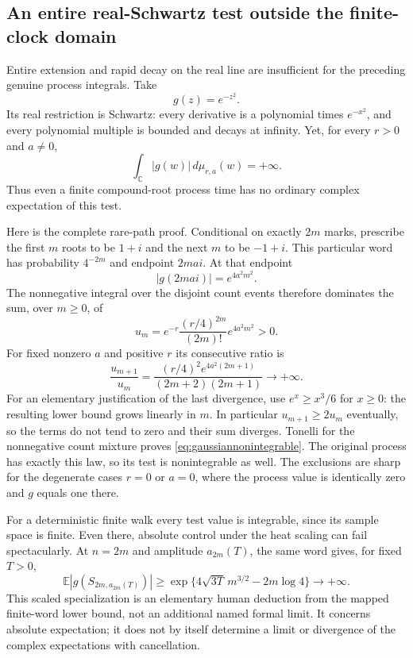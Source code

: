 \documentclass[11pt]{article}
\newcommand{\C}{\mathbb C}\newcommand{\R}{\mathbb R}
\newcommand{\E}{\mathbb E}\newcommand{\Pp}{\mathbb P}
\begin{document}
\subsection*{An entire real-Schwartz test outside the finite-clock domain}
Entire extension and rapid decay on the real line are insufficient for
the preceding genuine process integrals. Take
\[
 g(z)=e^{-z^2}.
\]
Its real restriction is Schwartz: every derivative is a polynomial
times $e^{-x^2}$, and every polynomial multiple is bounded and decays
at infinity. Yet, for every $r>0$ and $a\ne0$,
\begin{equation}\label{eq:gaussiannonintegrable}
 \int_{\C}|g(w)|\,d\mu_{r,a}(w)=+\infty.
\end{equation}
Thus even a finite compound-root process time has no ordinary complex
expectation of this test.

Here is the complete rare-path proof. Conditional on exactly $2m$
marks, prescribe the first $m$ roots to be $1+i$ and the next $m$
to be $-1+i$. This particular word has probability $4^{-2m}$ and
endpoint $2mai$. At that endpoint
\[
 |g(2mai)|=e^{4a^2m^2}.
\]
The nonnegative integral over the disjoint count events therefore
dominates the sum, over $m\geq0$, of
\[
 u_m=e^{-r}\frac{(r/4)^{2m}}{(2m)!}e^{4a^2m^2}>0.
\]
For fixed nonzero $a$ and positive $r$ its consecutive ratio is
\[
 \frac{u_{m+1}}{u_m}
 =\frac{(r/4)^2 e^{4a^2(2m+1)}}{(2m+2)(2m+1)}\longrightarrow+\infty.
\]
For an elementary justification of the last divergence, use
$e^x\geq x^3/6$ for $x\geq0$: the resulting lower bound grows linearly
in $m$. In particular $u_{m+1}\geq2u_m$ eventually, so the terms do
not tend to zero and their sum diverges. Tonelli for the nonnegative
count mixture proves \eqref{eq:gaussiannonintegrable}. The original
process has exactly this law, so its test is nonintegrable as well.
The exclusions are sharp for the degenerate cases $r=0$ or $a=0$,
where the process value is identically zero and $g$ equals one there.

For a deterministic finite walk every test value is integrable, since
its sample space is finite. Even there, absolute control under the heat
scaling can fail spectacularly. At $n=2m$ and amplitude $a_{2m}(T)$,
the same word gives, for fixed $T>0$,
\[
 \E|g(S_{2m,a_{2m}(T)})|
 \geq\exp\{4\sqrt{3T}\,m^{3/2}-2m\log4\}
 \longrightarrow+\infty.
\]
This scaled specialization is an elementary human deduction from the
mapped finite-word lower bound, not an additional named formal limit.
It concerns absolute expectation; it does not by itself determine a
limit or divergence of the complex expectations with cancellation.
\end{document}
